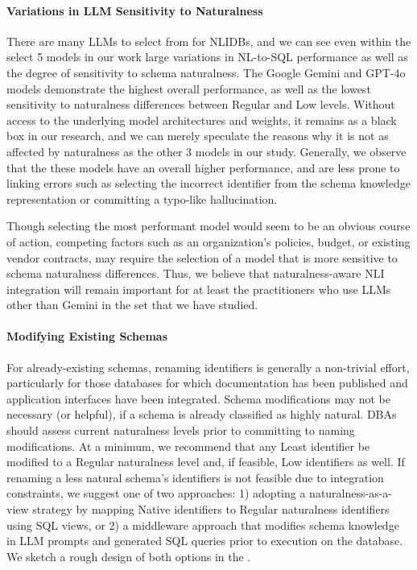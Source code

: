 \paragraph{\textbf{Variations in LLM Sensitivity to Naturalness}}
There are many LLMs to select from for NLIDBs, and we can see even within the select 5 models in our work large variations in NL-to-SQL performance as well as the degree of sensitivity to schema naturalness.
The Google Gemini and GPT-4o models demonstrate the highest overall performance, as well as the lowest sensitivity to naturalness differences between Regular and Low levels.
Without access to the underlying model architectures and weights, it remains as a black box in our research, and we can merely speculate the reasons why it is not as affected by naturalness as the other 3 models in our study.
Generally, we observe that the these models have an overall higher performance, and are less prone to linking errors such as selecting the incorrect identifier from the schema knowledge representation or committing a typo-like hallucination.

Though selecting the most performant model would seem to be an obvious course of action, competing factors such as an organization's policies, budget, or existing vendor contracts, may require the selection of a model that is more sensitive to schema naturalness differences. 
Thus, we believe that naturalness-aware NLI integration will remain important for at least the practitioners who use LLMs other than Gemini in the set that we have studied.


\paragraph{\textbf{Modifying Existing Schemas}}
For already-existing schemas, renaming identifiers is generally a non-trivial effort, particularly for those databases for which documentation has been published and application interfaces have been integrated.
Schema modifications may not be necessary (or helpful), if a schema is already classified as highly natural.
DBAs should assess current naturalness levels prior to committing to naming modifications.
At a minimum, we recommend that any Least identifier be modified to a Regular naturalness level and, if feasible, Low identifiers as well.
If renaming a less natural schema's identifiers is not feasible due to integration constraints, we suggest one of two approaches: 1) adopting a naturalness-as-a-view strategy by mapping Native identifiers to Regular naturalness identifiers using SQL views, or 2) a middleware approach that modifies schema knowledge in LLM prompts and generated SQL queries prior to execution on the database.
We sketch a rough design of both options in the \fi.

